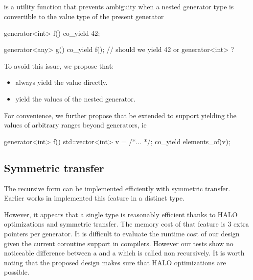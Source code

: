 \documentclass{wg21}
\begin{document}
\subsection{}

 is a utility function that prevents ambiguity when a nested generator type is convertible to the value type
of the present generator

\begin{colorblock}
    generator<int> f()
    {
        co_yield 42;
    }

    generator<any> g()
    {
        co_yield f(); // should we yield 42 or generator<int> ?
    }

\end{colorblock}

To avoid this issue, we propose that:

\begin{itemize}
    \item {} always yield the value directly.
    \item {} yield the values of the nested generator.
\end{itemize}


For convenience, we further propose that  be extended to support
yielding the values of arbitrary ranges beyond generators, ie

\begin{colorblock}
    generator<int> f()
    {
        std::vector<int> v = /*... */;
        co_yield elements_of(v);
    }

\end{colorblock}

\subsection{Symmetric transfer}

The recursive form can be implemented efficiently with symmetric transfer.
Earlier works in \cite{CppCoro} implemented this feature in a distinct  type.

However, it appears that a single type is reasonably efficient thanks to HALO optimizations and symmetric transfer.
The memory cost of that feature is 3 extra pointers per generator.
It is difficult to evaluate the runtime cost of our design given the current coroutine support in compilers.
However our tests show no noticeable difference between a  and a 
which is called non recursively. It is worth noting that the proposed design makes sure that HALO \cite{P0981R0} optimizations are possible.
\end{document}
